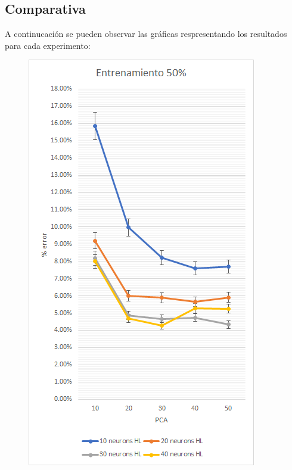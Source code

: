 \documentclass[a4paper]{article}
\begin{document}
\newpage
\subsection{Comparativa}

A continucación se pueden observar las gráficas respresentando los resultados para cada experimento:

\begin{figure}[!h]
	\begin{adjustwidth}{-70pt}{-70pt}
	  \centering
	  \begin{minipage}[b]{0.65\textwidth}
	    \includegraphics[width=\textwidth]{3_50_graph}

\end{minipage}
\end{adjustwidth}
\end{figure}
\end{document}
